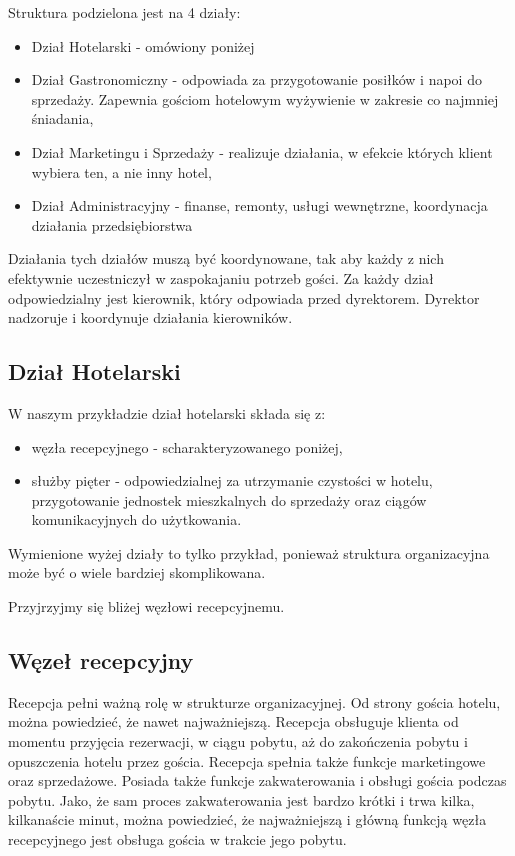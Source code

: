 \documentclass[a4paper,onecolumn,oneside,11pt,wide,floatssmall]{mwrep}
\theoremstyle{definition}
\theoremstyle{plain}%
\theoremstyle{remark}
\begin{document}
Struktura podzielona jest na 4 działy:
\begin{itemize}
  \item Dział Hotelarski - omówiony poniżej
  \item Dział Gastronomiczny - odpowiada za przygotowanie posiłków i napoi 
  do sprzedaży. Zapewnia gościom hotelowym wyżywienie w zakresie co najmniej 
  śniadania,
  \item Dział Marketingu i Sprzedaży - realizuje działania, w efekcie 
  których klient wybiera ten, a nie inny hotel,
  \item Dział Administracyjny - finanse, remonty, usługi wewnętrzne, 
  koordynacja działania przedsiębiorstwa
\end{itemize}

Działania tych działów muszą być koordynowane, tak aby każdy z nich 
efektywnie uczestniczył w zaspokajaniu potrzeb gości. Za każdy dział 
odpowiedzialny jest kierownik, który odpowiada przed dyrektorem. Dyrektor
 nadzoruje i koordynuje działania kierowników.

\subsection{Dział Hotelarski}
W naszym przykładzie dział hotelarski składa się z:
\begin{itemize}
  \item węzła recepcyjnego - scharakteryzowanego poniżej,
  \item służby pięter - odpowiedzialnej za utrzymanie czystości w hotelu, 
  przygotowanie jednostek mieszkalnych do sprzedaży oraz ciągów 
  komunikacyjnych do użytkowania.
\end{itemize}

Wymienione wyżej działy to tylko przykład, ponieważ struktura 
organizacyjna może być o wiele bardziej skomplikowana.

Przyjrzyjmy się bliżej węzłowi recepcyjnemu.

\subsection{Węzeł recepcyjny}
Recepcja pełni ważną rolę w strukturze organizacyjnej. Od strony gościa hotelu, 
można powiedzieć, że nawet najważniejszą. 
Recepcja obsługuje klienta od momentu przyjęcia rezerwacji, w ciągu pobytu, 
aż do zakończenia pobytu i opuszczenia hotelu przez gościa. Recepcja spełnia 
także funkcje marketingowe 
oraz sprzedażowe. Posiada także funkcje zakwaterowania i obsługi gościa 
podczas pobytu. Jako, że sam proces zakwaterowania jest bardzo krótki i trwa 
kilka, kilkanaście minut, można powiedzieć, że najważniejszą i główną funkcją 
węzła recepcyjnego jest obsługa gościa w trakcie jego pobytu.
\end{document}
